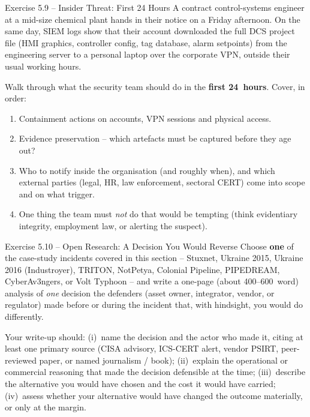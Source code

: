 \documentclass[11pt,a4paper]{article}
\begin{document}
\begin{taskbox}{Exercise 5.9 -- Insider Threat: First 24 Hours}
A contract control-systems engineer at a mid-size chemical plant hands in their notice on a
Friday afternoon. On the same day, SIEM logs show that their account downloaded the full DCS
project file (HMI graphics, controller config, tag database, alarm setpoints) from the
engineering server to a personal laptop over the corporate VPN, outside their usual
working hours.

Walk through what the security team should do in the \textbf{first 24~hours}. Cover, in order:
\begin{enumerate}\setlength{\itemsep}{0pt}
  \item Containment actions on accounts, VPN sessions and physical access.
  \item Evidence preservation -- which artefacts must be captured before they age out?
  \item Who to notify inside the organisation (and roughly when), and which external parties
        (legal, HR, law enforcement, sectoral CERT) come into scope and on what trigger.
  \item One thing the team must \emph{not} do that would be tempting (think evidentiary
        integrity, employment law, or alerting the suspect).
\end{enumerate}
\end{taskbox}

\begin{taskbox}{Exercise 5.10 -- Open Research: A Decision You Would Reverse}
Choose \textbf{one} of the case-study incidents covered in this section -- Stuxnet, Ukraine
2015, Ukraine 2016 (Industroyer), TRITON, NotPetya, Colonial Pipeline, PIPEDREAM,
CyberAv3ngers, or Volt Typhoon -- and write a one-page (about 400--600~word) analysis of
\emph{one} decision the defenders (asset owner, integrator, vendor, or regulator) made before
or during the incident that, with hindsight, you would do differently.

Your write-up should: (i)~name the decision and the actor who made it, citing at least one
primary source (CISA advisory, ICS-CERT alert, vendor PSIRT, peer-reviewed paper, or named
journalism / book); (ii)~explain the operational or commercial reasoning that made the
decision defensible at the time; (iii)~describe the alternative you would have chosen and
the cost it would have carried; (iv)~assess whether your alternative would have changed the
outcome materially, or only at the margin.
\end{taskbox}
\end{document}
